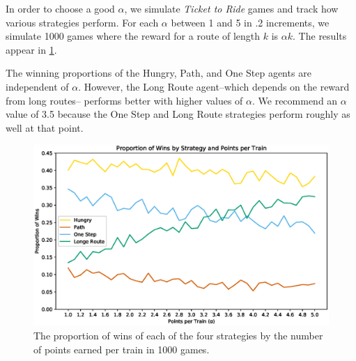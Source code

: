 In order to choose a good $\alpha$, we simulate 
\textit{Ticket to Ride} games and track how various
strategies perform.
For each $\alpha$ between 1 and 5 in .2 increments,
we simulate 1000 games where the reward for a route
of length $k$ is $\alpha k$.
The results appear in \cref{fig:points}.

The winning proportions of the Hungry, Path, and One
Step agents are independent of $\alpha$.
However, the Long Route agent--which
depends on the reward from long routes--
performs better with higher values of $\alpha$.
We recommend an $\alpha$ value of 
3.5 because the One Step
and Long Route strategies perform roughly as well at that point.

\begin{figure}[h]
    \centering
    \includegraphics[scale=.65]{figures/points}
    \caption{The proportion of wins of each of the four strategies
    by the number of points earned per train in 1000 games.}
    \label{fig:points}
\end{figure}

